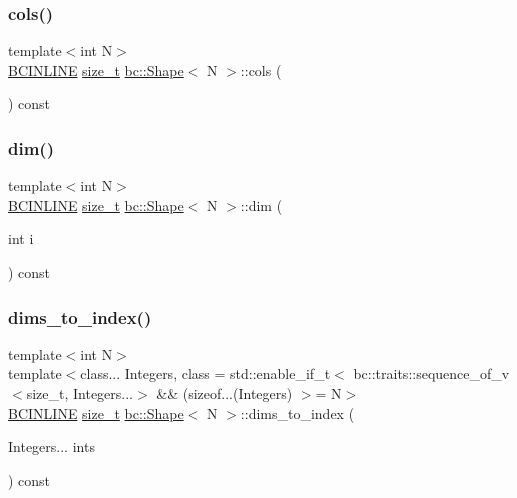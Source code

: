 \subsubsection{\texorpdfstring{cols()}{cols()}}
{\footnotesize\ttfamily template$<$int N$>$ \\
\hyperlink{common_8h_a6699e8b0449da5c0fafb878e59c1d4b1}{B\+C\+I\+N\+L\+I\+NE} \hyperlink{structbc_1_1Shape_a63f974ebdb0e3755ef3140b17abcf235}{size\+\_\+t} \hyperlink{structbc_1_1Shape}{bc\+::\+Shape}$<$ N $>$\+::cols (\begin{DoxyParamCaption}{ }\end{DoxyParamCaption}) const\hspace{0.3cm}{\ttfamily [inline]}}

\mbox{\label{structbc_1_1Shape_acced7d5436419a46dbb2736457f6585c}} 
\subsubsection{\texorpdfstring{dim()}{dim()}}
{\footnotesize\ttfamily template$<$int N$>$ \\
\hyperlink{common_8h_a6699e8b0449da5c0fafb878e59c1d4b1}{B\+C\+I\+N\+L\+I\+NE} \hyperlink{structbc_1_1Shape_a63f974ebdb0e3755ef3140b17abcf235}{size\+\_\+t} \hyperlink{structbc_1_1Shape}{bc\+::\+Shape}$<$ N $>$\+::dim (\begin{DoxyParamCaption}\item[{int}]{i }\end{DoxyParamCaption}) const\hspace{0.3cm}{\ttfamily [inline]}}

\mbox{\label{structbc_1_1Shape_a84e2316eaa358ff0fa23987623057c3f}} 
\subsubsection{\texorpdfstring{dims\+\_\+to\+\_\+index()}{dims\_to\_index()}\hspace{0.1cm}{\footnotesize\ttfamily [1/2]}}
{\footnotesize\ttfamily template$<$int N$>$ \\
template$<$class... Integers, class  = std\+::enable\+\_\+if\+\_\+t$<$			bc\+::traits\+::sequence\+\_\+of\+\_\+v$<$size\+\_\+t, Integers...$>$ \&\&			(sizeof...(\+Integers) $>$= N$>$ \\
\hyperlink{common_8h_a6699e8b0449da5c0fafb878e59c1d4b1}{B\+C\+I\+N\+L\+I\+NE} \hyperlink{structbc_1_1Shape_a63f974ebdb0e3755ef3140b17abcf235}{size\+\_\+t} \hyperlink{structbc_1_1Shape}{bc\+::\+Shape}$<$ N $>$\+::dims\+\_\+to\+\_\+index (\begin{DoxyParamCaption}\item[{Integers...}]{ints }\end{DoxyParamCaption}) const\hspace{0.3cm}{\ttfamily [inline]}}

